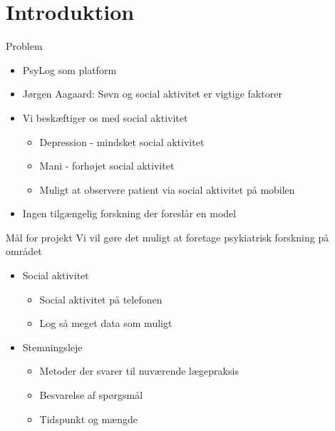 \section{Introduktion}
{\aauwavesbg%
	\begin{frame}{Problem} %
\begin{itemize}
	\item PsyLog som platform
	\item Jørgen Aagaard: Søvn og social aktivitet er vigtige faktorer
	\item Vi beskæftiger os med social aktivitet
	\begin{itemize}
		\item Depression - mindsket social aktivitet
		\item Mani - forhøjet social aktivitet
		\item Muligt at observere patient via social aktivitet på mobilen
	\end{itemize}
	\item Ingen tilgængelig forskning der foreslår en model
\end{itemize}

\end{frame}}


{\aauwavesbg%
	\begin{frame}{Mål for projekt} %
		Vi vil gøre det muligt at foretage psykiatrisk forskning på området
		\begin{itemize}
			\item Social aktivitet
			\begin{itemize}
				\item Social aktivitet på telefonen
				\item Log så meget data som muligt
			\end{itemize}	
			\item Stemningsleje
			\begin{itemize}
				\item Metoder der svarer til nuværende lægepraksis
				\item Besvarelse af spørgsmål
				\item Tidspunkt og mængde
			\end{itemize}
		\end{itemize}
	\end{frame}}
	



